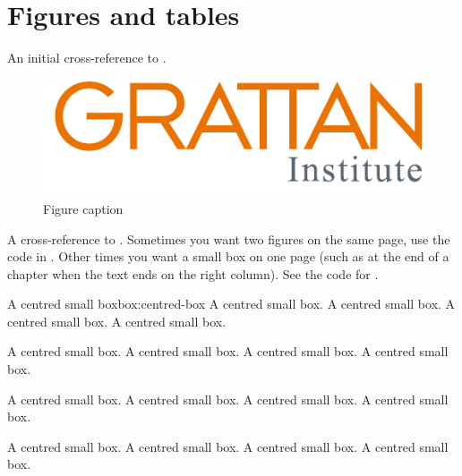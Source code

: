 \documentclass{grattan}
\begin{document}
\chapter{Figures and tables}\label{chap:figs-and-tbls}
An initial cross-reference to .

\begin{figure}
\caption{Figure caption\label{fig:first-example-figure}}
\includegraphics{logos/GrattanSVGLogo.pdf}
\end{figure}

A cross-reference to .
Sometimes you want two figures on the same page, use the code in .
Other times you want a small box on one page (such as at the end of a chapter when the text ends on the right column).
See the code for .


\begin{centredsmallbox}{A centred small box}{box:centred-box}
A centred small box.
A centred small box.
A centred small box.
A centred small box.

A centred small box.
A centred small box.
A centred small box.
A centred small box.

A centred small box.
A centred small box.
A centred small box.
A centred small box.

A centred small box.
A centred small box.
A centred small box.
A centred small box.
\end{centredsmallbox}
\end{document}
